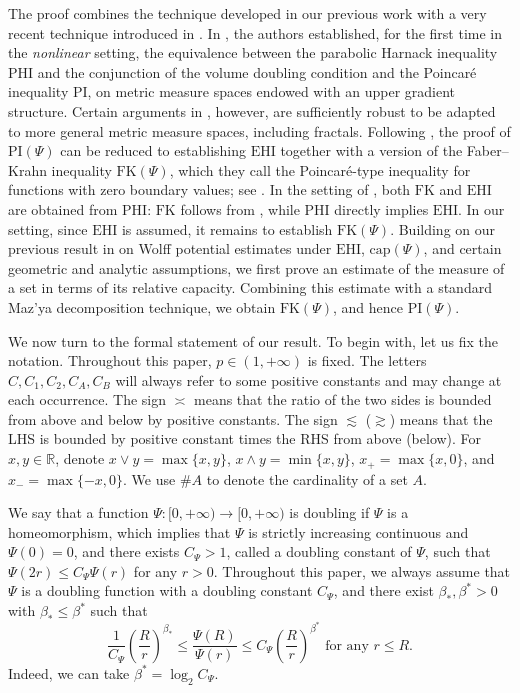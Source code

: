 \documentclass[10pt,a4paper]{amsart}
\numberwithin{equation}{section}
\begin{document}
The proof combines the technique developed in our previous work \cite{Yan25d} with a very recent technique introduced in \cite{EK26}. In \cite{EK26}, the authors established, for the first time in the \emph{nonlinear} setting, the equivalence between the parabolic Harnack inequality $\text{PHI}$ and the conjunction of the volume doubling condition and the Poincar\'e inequality $\text{PI}$, on metric measure spaces endowed with an upper gradient structure. Certain arguments in \cite{EK26}, however, are sufficiently robust to be adapted to more general metric measure spaces, including fractals. Following \cite[Lemmas 2.5 and 7.5, Theorem 7.6]{EK26}, the proof of $\text{PI}(\Psi)$ can be reduced to establishing $\text{EHI}$ together with a version of the Faber--Krahn inequality $\text{FK}(\Psi)$, which they call the Poincar\'e-type inequality for functions with zero boundary values; see \cite[(7.1), (7.10)]{EK26}. In the setting of \cite{EK26}, both $\text{FK}$ and $\text{EHI}$ are obtained from $\text{PHI}$: $\text{FK}$ follows from \cite[Proposition 7.1]{EK26}, while $\text{PHI}$ directly implies $\text{EHI}$. In our setting, since $\text{EHI}$ is assumed, it remains to establish $\text{FK}(\Psi)$. Building on our previous result in \cite{Yan25d} on Wolff potential estimates under $\text{EHI}$, $\text{cap}(\Psi)$, and certain geometric and analytic assumptions, we first prove an estimate of the measure of a set in terms of its relative capacity. Combining this estimate with a standard Maz'ya decomposition technique, we obtain $\text{FK}(\Psi)$, and hence $\text{PI}(\Psi)$.

We now turn to the formal statement of our result. To begin with, let us fix the notation. Throughout this paper, $p\in(1,+\infty)$ is fixed. The letters $C,C_1,C_2,C_A, C_B$ will always refer to some positive constants and may change at each occurrence. The sign $\asymp$ means that the ratio of the two sides is bounded from above and below by positive constants. The sign $\lesssim$ ($\gtrsim$) means that the LHS is bounded by positive constant times the RHS from above (below). For $x,y\in \mathbb{R}$, denote $x\vee y=\max\{x,y\}$, $x\wedge y=\min\{x,y\}$, $x_+=\max\{x,0\}$, and $x_-=\max\{-x,0\}$. We use $\# A$ to denote the cardinality of a set $A$.

We say that a function $\Psi:[0,+\infty)\to[0,+\infty)$ is doubling if $\Psi$ is a homeomorphism, which implies that $\Psi$ is strictly increasing continuous and $\Psi(0)=0$, and there exists $C_\Psi>1$, called a doubling constant of $\Psi$, such that $\Psi(2r)\le C_\Psi\Psi(r)$ for any $r>0$. Throughout this paper, we always assume that $\Psi$ is a doubling function with a doubling constant $C_\Psi$, and there exist $\beta_*, \beta^*>0$ with $\beta_*\le\beta^*$ such that
$$\frac{1}{C_\Psi}\left(\frac{R}{r}\right)^{\beta_*}\le \frac{\Psi(R)}{\Psi(r)}\le C_{\Psi}\left(\frac{R}{r}\right)^{\beta^*}\text{ for any }r\le R.$$
Indeed, we can take $\beta^*=\log_2C_\Psi$.
\end{document}

